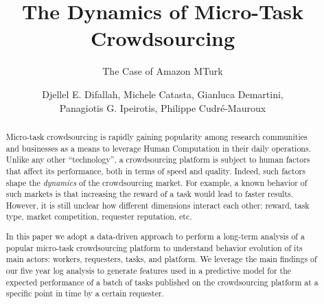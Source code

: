 \documentclass{sig-alternate}
\begin{document}
%

\title{The Dynamics of Micro-Task Crowdsourcing}
\subtitle{The Case of Amazon MTurk}


\author{Djellel E. Difallah, Michele Catasta, Gianluca Demartini, \\ Panagiotis G. Ipeirotis, Philippe Cudr\'e-Mauroux}

\maketitle
\begin{abstract}
Micro-task crowdsourcing is rapidly gaining popularity among research communities and businesses as a means to leverage Human Computation in their daily operations. Unlike any other ``technology'', a crowdsourcing platform is subject to human factors that affect its performance, both in terms of speed and quality. Indeed, such factors shape the \emph{dynamics} of the crowdsourcing market. For example, a known behavior of such markets is that increasing the reward of a task would lead to faster results. However, it is still unclear how different dimensions interact each other: reward, task type, market competition, requester reputation, etc.

In this paper we adopt a data-driven approach to perform a long-term analysis of a popular micro-task crowdsourcing platform to understand behavior evolution of its main actors: workers, requesters, tasks, and platform. We leverage the main findings of our five year log analysis to generate features used in a predictive model for the expected performance of a batch of tasks published on the crowdsourcing platform at a specific point in time by a certain requester.
\end{abstract}
\end{document}
